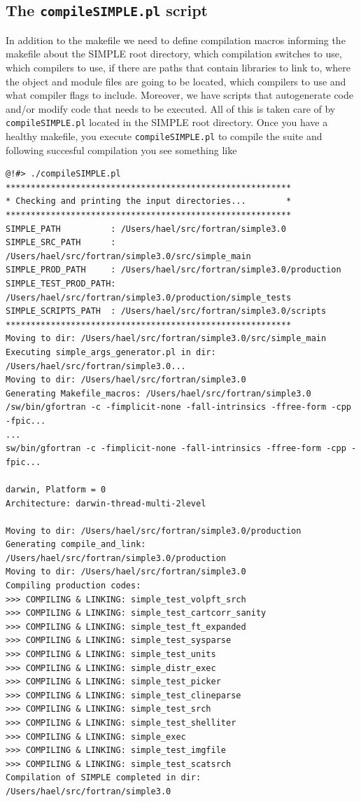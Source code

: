\documentclass[a4paper,11pt]{article}
\begin{document}
\subsection{The \texttt{compileSIMPLE.pl} script}
In addition to the makefile we need to define compilation macros informing the makefile about the SIMPLE root directory, which compilation switches to use, which compilers to use, if there are paths that contain libraries to link to, where the object and module files are going to be located, which compilers to use and what compiler flags to include. Moreover, we have scripts that autogenerate code and/or modify code that needs to be executed. All of this is taken care of by \texttt{compileSIMPLE.pl} located in the SIMPLE root directory. Once you have a healthy makefile, you execute \texttt{compileSIMPLE.pl} to compile the suite and following succesful compilation you see something like
\begin{verbatim}
@!#> ./compileSIMPLE.pl 
*********************************************************
* Checking and printing the input directories...        *
*********************************************************
SIMPLE_PATH          : /Users/hael/src/fortran/simple3.0
SIMPLE_SRC_PATH      : /Users/hael/src/fortran/simple3.0/src/simple_main
SIMPLE_PROD_PATH     : /Users/hael/src/fortran/simple3.0/production
SIMPLE_TEST_PROD_PATH: /Users/hael/src/fortran/simple3.0/production/simple_tests
SIMPLE_SCRIPTS_PATH  : /Users/hael/src/fortran/simple3.0/scripts
*********************************************************
Moving to dir: /Users/hael/src/fortran/simple3.0/src/simple_main
Executing simple_args_generator.pl in dir: /Users/hael/src/fortran/simple3.0...
Moving to dir: /Users/hael/src/fortran/simple3.0
Generating Makefile_macros: /Users/hael/src/fortran/simple3.0
/sw/bin/gfortran -c -fimplicit-none -fall-intrinsics -ffree-form -cpp -fpic...
...
sw/bin/gfortran -c -fimplicit-none -fall-intrinsics -ffree-form -cpp -fpic... 

darwin, Platform = 0
Architecture: darwin-thread-multi-2level

Moving to dir: /Users/hael/src/fortran/simple3.0/production
Generating compile_and_link: /Users/hael/src/fortran/simple3.0/production
Moving to dir: /Users/hael/src/fortran/simple3.0
Compiling production codes:
>>> COMPILING & LINKING: simple_test_volpft_srch
>>> COMPILING & LINKING: simple_test_cartcorr_sanity
>>> COMPILING & LINKING: simple_test_ft_expanded
>>> COMPILING & LINKING: simple_test_sysparse
>>> COMPILING & LINKING: simple_test_units
>>> COMPILING & LINKING: simple_distr_exec
>>> COMPILING & LINKING: simple_test_picker
>>> COMPILING & LINKING: simple_test_clineparse
>>> COMPILING & LINKING: simple_test_srch
>>> COMPILING & LINKING: simple_test_shelliter
>>> COMPILING & LINKING: simple_exec
>>> COMPILING & LINKING: simple_test_imgfile
>>> COMPILING & LINKING: simple_test_scatsrch
Compilation of SIMPLE completed in dir: /Users/hael/src/fortran/simple3.0
\end{verbatim}
\end{document}
